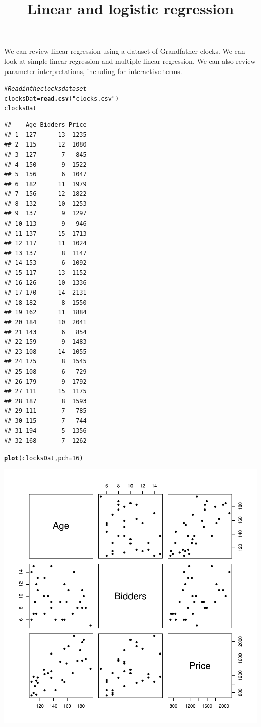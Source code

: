 \documentclass{article}\usepackage[]{graphicx}\usepackage[]{color}
\makeatletter
\newcommand{\hlnum}[1]{\textcolor[rgb]{0.686,0.059,0.569}{#1}}%
\newcommand{\hlstr}[1]{\textcolor[rgb]{0.192,0.494,0.8}{#1}}%
\newcommand{\hlcom}[1]{\textcolor[rgb]{0.678,0.584,0.686}{\textit{#1}}}%
\newcommand{\hlstd}[1]{\textcolor[rgb]{0.345,0.345,0.345}{#1}}%
\newcommand{\hlkwb}[1]{\textcolor[rgb]{0.69,0.353,0.396}{#1}}%
\newcommand{\hlkwc}[1]{\textcolor[rgb]{0.333,0.667,0.333}{#1}}%
\newcommand{\hlkwd}[1]{\textcolor[rgb]{0.737,0.353,0.396}{\textbf{#1}}}%
\newenvironment{kframe}{%
 \def\at@end@of@kframe{}%
 \ifinner\ifhmode%
  \def\at@end@of@kframe{\end{minipage}}%
  \begin{minipage}{\columnwidth}%
 \fi\fi%
 \def\FrameCommand##1{\hskip\@totalleftmargin \hskip-\fboxsep
 \colorbox{shadecolor}{##1}\hskip-\fboxsep
     \hskip-\linewidth \hskip-\@totalleftmargin \hskip\columnwidth}%
 \MakeFramed {\advance\hsize-\width
   \@totalleftmargin\z@ \linewidth\hsize
   \@setminipage}}%
 {\par\unskip\endMakeFramed%
 \at@end@of@kframe}
\newenvironment{knitrout}{}{} %
\makeatother
\begin{document}


\title{Linear and logistic regression}

\maketitle

We can review linear regression using a dataset of Grandfather clocks. We can look at simple linear regression and multiple linear regression. We can also review parameter interpretations, including for interactive terms.

\begin{knitrout}
\color{fgcolor}\begin{kframe}
\begin{alltt}
\hlcom{# Read in the clocks dataset}
\hlstd{clocksDat} \hlkwb{=} \hlkwd{read.csv}\hlstd{(}\hlstr{"clocks.csv"}\hlstd{)}
\hlstd{clocksDat}
\end{alltt}
\begin{verbatim}
##    Age Bidders Price
## 1  127      13  1235
## 2  115      12  1080
## 3  127       7   845
## 4  150       9  1522
## 5  156       6  1047
## 6  182      11  1979
## 7  156      12  1822
## 8  132      10  1253
## 9  137       9  1297
## 10 113       9   946
## 11 137      15  1713
## 12 117      11  1024
## 13 137       8  1147
## 14 153       6  1092
## 15 117      13  1152
## 16 126      10  1336
## 17 170      14  2131
## 18 182       8  1550
## 19 162      11  1884
## 20 184      10  2041
## 21 143       6   854
## 22 159       9  1483
## 23 108      14  1055
## 24 175       8  1545
## 25 108       6   729
## 26 179       9  1792
## 27 111      15  1175
## 28 187       8  1593
## 29 111       7   785
## 30 115       7   744
## 31 194       5  1356
## 32 168       7  1262
\end{verbatim}
\begin{alltt}
\hlkwd{plot}\hlstd{(clocksDat,}\hlkwc{pch}\hlstd{=}\hlnum{16}\hlstd{)}
\end{alltt}
\end{kframe}
\includegraphics[width=.6\linewidth]{figure/unnamed-chunk-1-1} 

\end{knitrout}
\end{document}
